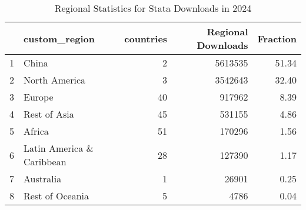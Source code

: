 \begin{table}[ht]
\centering
\begin{tabular}{rlrrr}
  \hline
 & custom\_region & countries & Regional Downloads & Fraction \\ 
  \hline
1 & China &   2 & 5613535 & 51.34 \\ 
  2 & North America &   3 & 3542643 & 32.40 \\ 
  3 & Europe &  40 & 917962 & 8.39 \\ 
  4 & Rest of Asia &  45 & 531155 & 4.86 \\ 
  5 & Africa &  51 & 170296 & 1.56 \\ 
  6 & Latin America \& Caribbean &  28 & 127390 & 1.17 \\ 
  7 & Australia &   1 & 26901 & 0.25 \\ 
  8 & Rest of Oceania &   5 & 4786 & 0.04 \\ 
   \hline
\end{tabular}
\caption{Regional Statistics for Stata Downloads in 2024} 
\label{tab:stata_downloads_regional_stats_2024}
\end{table}
